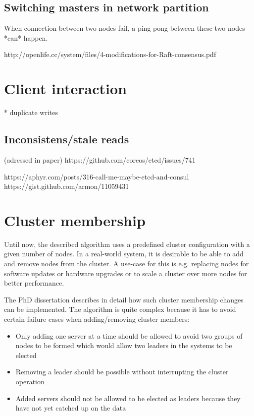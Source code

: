 \subsection{Switching masters in network partition}
When connection between two nodes fail, a ping-pong between these two nodes *can* happen.

http://openlife.cc/system/files/4-modifications-for-Raft-consensus.pdf

\section{Client interaction}

* duplicate writes

\subsection{Inconsistens/stale reads}
(adressed in paper)
https://github.com/coreos/etcd/issues/741

https://aphyr.com/posts/316-call-me-maybe-etcd-and-consul
https://gist.github.com/armon/11059431


\section{Cluster membership}
Until now, the described algorithm uses a predefined cluster configuration with a given number of nodes. In a real-world system, it is desirable to
be able to add and remove nodes from the cluster. A use-case for this is e.g. replacing nodes for software updates or hardware upgrades or to
scale a cluster over more nodes for better performance.

The PhD dissertation \cite{raft_phd_thesis} describes in detail how such cluster membership changes can be implemented.
The algorithm is quite complex because it has to avoid certain failure cases when adding/removing cluster members:

\begin{itemize}
    \item Only adding one server at a time should be allowed to avoid two groups of nodes to be formed which would allow two leaders in the systems to be elected
    \item Removing a leader should be possible without interrupting the cluster operation
    \item Added servers should not be allowed to be elected as leaders because they have not yet catched up on the data
\end{itemize}

